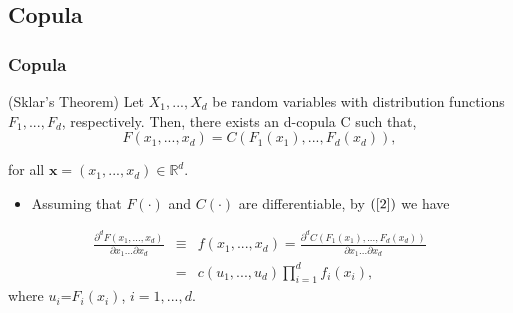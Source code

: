 \documentclass[pdf,9pt,xcolor=dvipsnames,hide notes]{beamer}
\DeclareMathOperator{\Ima}{Im}
\begin{document}
\subsection{Copula}
\begin{frame}[label=frame4]
	\frametitle{Copula}
	
	\begin{theorem}
		(Sklar's Theorem) Let $X_{1},...,X_{d}$ be random variables with
		distribution functions $F_{1},...,F_{d}$, respectively. Then, there exists
		an d-copula C such that,
		\begin{equation}
		F\left( x_{1},...,x_{d}\right) =C\left( F_{1}\left( x_{1}\right)
		,...,F_{d}\left( x_{d}\right) \right) ,  \label{2}
		\end{equation}
	\end{theorem}
	for all $\mathbf{x}=\left( x_{1},...,x_{d}\right) \in \mathbb{R}^{d}$.
	
	
	\vspace{0.3cm}
	
	\begin{itemize}
		\justifying
		
		\item Assuming that $F\left( \cdot \right) $ and $C\left( \cdot
		\right) $ are differentiable, by $\left( \ref{2}\right)$ we have
		
	\end{itemize}
	
	\begin{eqnarray}
	\frac{\partial ^{d}F\left( x_{1},...,x_{d}\right) }{\partial
		x_{1}...\partial x_{d}} &\equiv &f\left( x_{1},...,x_{d}\right) =\frac{
		\partial ^{d}C\left( F_{1}\left( x_{1}\right) ,...,F_{d}\left( x_{d}\right)
		\right) }{\partial x_{1}...\partial x_{d}} \\
	&=&c\left( u_{1},...,u_{d}\right) \prod_{i=1}^{d}f_{i}\left( x_{i}\right),
	\label{23}
	\end{eqnarray}%
	where $u_{i}$=$F_{i}\left( x_{i}\right) $, $i=1,...,d$.
	
	
	
\end{frame}
\end{document}
